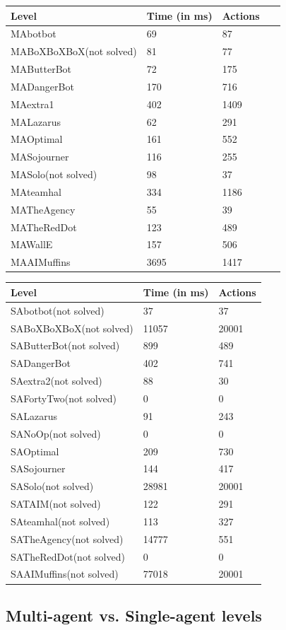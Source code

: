 \begin{tabular}{ | l | l | l | l | }
\hline
	Level & Time (in ms) & Actions & \  \\ \hline
	MAbotbot & 69 & 87 & \  \\ \hline
	MABoXBoXBoX(not solved) & 81 & 77 & \  \\ \hline
	MAButterBot & 72 & 175 &   \\ \hline
	MADangerBot & 170 & 716 & \  \\ \hline
	MAextra1 & 402 & 1409 & \  \\ \hline
	MALazarus & 62 & 291 & \  \\ \hline
	MAOptimal & 161 & 552 & \  \\ \hline
	MASojourner & 116 & 255 & \  \\ \hline
	MASolo(not solved) & 98 & 37 & \  \\ \hline
	MAteamhal & 334 & 1186 & \  \\ \hline
	MATheAgency & 55 & 39 & \  \\ \hline
	MATheRedDot & 123 & 489 & \  \\ \hline
	MAWallE & 157 & 506 & \  \\ \hline
	MAAIMuffins & 3695 & 1417 & \  \\ \hline
\end{tabular}

\begin{tabular}{ | l | l | l | }
\hline
	Level & Time (in ms) & Actions \\ \hline
	SAbotbot(not solved) & 37 & 37 \\ \hline
	SABoXBoXBoX(not solved) & 11057 & 20001 \\ \hline
	SAButterBot(not solved) & 899 & 489 \\ \hline
	SADangerBot & 402 & 741 \\ \hline
	SAextra2(not solved) & 88 & 30 \\ \hline
	SAFortyTwo(not solved) & 0 & 0 \\ \hline
	SALazarus & 91 & 243 \\ \hline
	SANoOp(not solved) & 0 & 0 \\ \hline
	SAOptimal & 209 & 730 \\ \hline
	SASojourner & 144 & 417 \\ \hline
	SASolo(not solved) & 28981 & 20001 \\ \hline
	SATAIM(not solved) & 122 & 291 \\ \hline
	SAteamhal(not solved) & 113 & 327 \\ \hline
	SATheAgency(not solved) & 14777 & 551 \\ \hline
	SATheRedDot(not solved) & 0 & 0 \\ \hline
	SAAIMuffins(not solved) & 77018 & 20001 \\ \hline
\end{tabular}



\subsection{Multi-agent vs. Single-agent levels}


